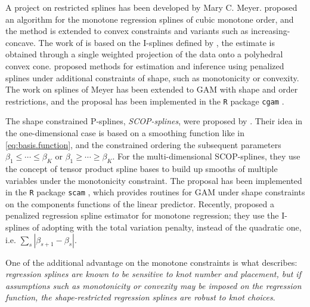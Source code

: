 \documentclass[11pt,letterpaper]{article}
\begin{document}
A project on restricted splines has been developed by Mary C. Meyer.  
\cite{Mey08} proposed an algorithm for the monotone regression splines of cubic monotone order, and the method is extended to convex constraints and variants such as increasing-concave. 
The work of \cite{Mey08} is based on the I-splines defined by \cite{Ram88}, the estimate is obtained through a single weighted projection of the data onto a polyhedral convex cone. 
\cite{Mey12} proposed methods for estimation and inference using penalized splines under additional constraints of shape, such as monotonicity or convexity. 
The work on splines of Meyer has been extended to GAM with shape and order restrictions, and the proposal has been implemented in the \texttt{R} package \texttt{cgam} \citep{Mey18,LiaMey19}. 

 The shape constrained P-splines, \textit{SCOP-splines}, were proposed by  \cite{PyaWoo15}. Their idea in the one-dimensional case is based on a smoothing function like in \eqref{eq:basis.function}, and the constrained ordering the subsequent parameters $\beta_1\leq\cdots\leq\beta_K$ or $\beta_1\geq\cdots\geq\beta_K$. 
 For the multi-dimensional SCOP-splines, they use the concept of tensor product spline bases to build up smooths of multiple variables under the monotonicity constraint.  
 The proposal has been implemented in the \texttt{R} package \texttt{scam} \citep{PyaWoo15}, which provides routines for GAM under shape constraints on the components functions of the linear predictor.
Recently,  \cite{ChoLeeJhoKoo21} proposed a penalized regression spline estimator for monotone regression; they use the I-splines of \cite{Ram88}  adopting with the total variation penalty, instead of the quadratic one, i.e. $\sum_{s}|\beta_{s+1}-\beta_s|$. 


One of the additional advantage on the  monotone constraints is what \cite{Mey08} describes: \textit{regression splines are known to be sensitive to knot number and placement, but if assumptions such as monotonicity or convexity may be imposed on the regression function, the shape-restricted regression splines are robust to knot choices}. 
\end{document}
